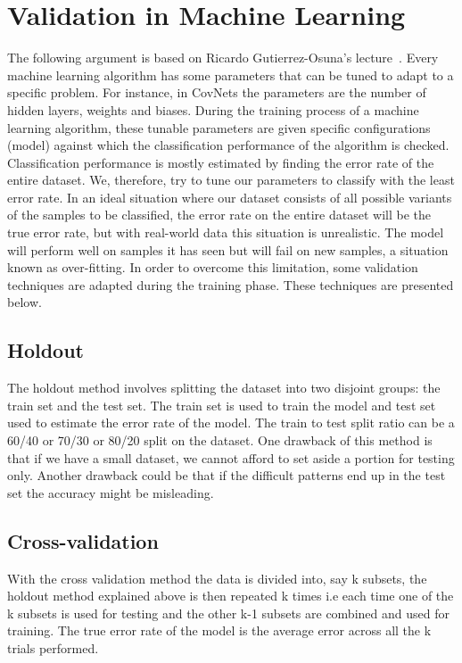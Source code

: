 \documentclass[12pt, a4paper,oneside]{report}
\begin{document}
\section{Validation in Machine Learning}
The following argument is based on Ricardo Gutierrez-Osuna's lecture~\cite{validation}.
Every machine learning algorithm has some parameters that can be tuned to adapt to a specific problem. For instance, in CovNets the parameters are the number of hidden layers, weights and biases. During the training process of a machine learning algorithm, these tunable parameters are given specific configurations (model) against which the classification performance of the algorithm is checked. 
Classification performance is mostly estimated by finding the error rate of the entire dataset. We, therefore, try to tune our parameters to classify with the least error rate. In an ideal situation where our dataset consists of all possible variants of the samples to be classified, the error rate on the entire dataset will be the true error rate, but with real-world data this situation is unrealistic. The model will perform well on samples it has seen but will fail on new samples, a situation known as over-fitting. In order to overcome this limitation, some validation techniques are adapted during the training phase. These techniques are presented below.

\subsection{Holdout}
The holdout method involves splitting the dataset into two disjoint groups: the train set and the test set. The train set is used to train the model and test set used to estimate the error rate of the model. The train to test split ratio can be a 60/40 or 70/30 or 80/20 split on the dataset. One drawback of this method is that if we have a small dataset, we cannot afford to set aside a portion for testing only. Another drawback could be that if the difficult patterns end up in the test set the accuracy might be misleading.

\subsection{Cross-validation}
With the cross validation method the data is divided into, say k subsets, the holdout method explained above is then repeated k times i.e each time one of the k subsets is used for testing and the other k-1 subsets are combined and used for training. The true error rate of the model is the average error across all the k trials performed.
\end{document}
